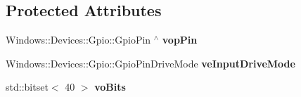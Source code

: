 \subsection*{Protected Attributes}
\begin{DoxyCompactItemize}
\item 
\mbox{\label{class_console_1_1_g_tc_d_h_t_sensor_ac7dd137b30bbda611805f59ec56a42e8}} 
Windows\+::\+Devices\+::\+Gpio\+::\+Gpio\+Pin $^\wedge$ {\bfseries vop\+Pin}
\item 
\mbox{\label{class_console_1_1_g_tc_d_h_t_sensor_aae9001c25efa86a88f5931a00373d60d}} 
Windows\+::\+Devices\+::\+Gpio\+::\+Gpio\+Pin\+Drive\+Mode {\bfseries ve\+Input\+Drive\+Mode}
\item 
\mbox{\label{class_console_1_1_g_tc_d_h_t_sensor_aa2a05e14611469c21527ea7bb85d88f6}} 
std\+::bitset$<$ 40 $>$ {\bfseries vo\+Bits}
\end{DoxyCompactItemize}
